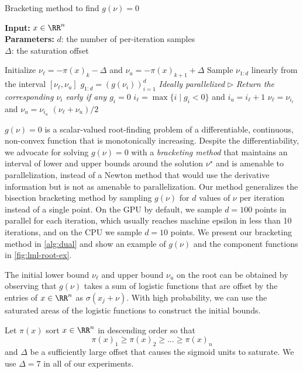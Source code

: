 \begin{algorithm}[t]
  \caption{Bracketing method to find $g(\nu)=0$}
  \label{alg:dual}
  \textbf{Input:} $x\in\RR^n$ \\
  \textbf{Parameters:} $d$: the number of per-iteration samples \\
  \hspace*{18.5mm}$\Delta$: the saturation offset
  \begin{algorithmic}[1]
    \State Initialize $\nu_\ell=-\pi(x)_k-\Delta$ and $\nu_u=-\pi(x)_{k+1}+\Delta$
    \State Sample $\nu_{1:d}$ linearly from the interval $[\nu_\ell, \nu_u]$
    \State $g_{1:d}=(g(\nu_i))_{i=1}^d$ \Comment \emph{Ideally parallelized}
    \State \(\triangleright\) \emph{Return the corresponding
        $\nu_i$ early if any $g_i=0$}
    \State $i_\ell = \max\{ i \mid g_i < 0\}$ and $i_u = i_\ell+1$
    \State $\nu_\ell = \nu_{i_\ell}$ and $\nu_u = \nu_{i_u}$
    \EndWhile
    \State \Return $(\nu_\ell+\nu_u)/2$
  \end{algorithmic}
\end{algorithm}

$g(\nu)=0$ is a scalar-valued root-finding problem
of a differentiable, continuous, non-convex function
that is monotonically increasing.
Despite the differentiability,
we advocate for solving $g(\nu)=0$ with a
\emph{bracketing method} that maintains an interval
of lower and upper bounds around the solution $\nu^\star$ and
is amenable to parallelization,
instead of a Newton method that would use the derivative
information but is not as amenable to parallelization.
Our method generalizes the bisection bracketing method
by sampling $g(\nu)$ for $d$ values of $\nu$ per iteration
instead of a single point.
On the GPU by default, we sample $d=100$ points in parallel
for each iteration, which usually reaches machine epsilon
in less than 10 iterations, and on the CPU we
sample $d=10$ points.
We present our bracketing method in \cref{alg:dual}
and show an example of $g(\nu)$ and the
component functions in \cref{fig:lml-root-ex}.

The initial lower bound $\nu_\ell$ and upper bound $\nu_u$ on the
root can be obtained by observing that $g(\nu)$ takes a sum of
logistic functions that are offset by the entries of $x\in\RR^n$
as $\sigma(x_j+\nu)$.
With high probability, we can use the saturated
areas of the logistic functions to construct the initial bounds.

Let $\pi(x)$ sort $x\in\RR^n$ in descending order so that
$$\pi(x)_1 \geq \pi(x)_2 \geq \ldots \geq \pi(x)_n$$
and $\Delta$ be a sufficiently large offset that causes
the sigmoid units to saturate.
We use $\Delta=7$ in all of our experiments.


